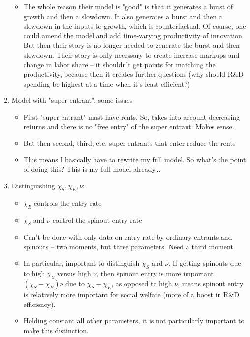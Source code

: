 \documentclass[12pt,english]{article}
\theoremstyle{remark}
\begin{document}
\begin{enumerate}
\begin{itemize}
		\item The whole reason their model is "good" is that it generates a burst of growth and then a slowdown. It also generates a burst and then a slowdown in the inputs to growth, which is counterfactual. Of course, one could amend the model and add time-varying productivity of innovation. But then their story is no longer needed to generate the burst and then slowdown. Their story is only necessary to create increase markups and change in labor share -- it shouldn't get points for matching the productivity, because then it creates further questions (why should R\&D spending be highest at a time when it's least efficient?)
	\end{itemize}
	\item Model with "super entrant": some issues
	\begin{itemize}
		\item First "super entrant" must have rents. So, takes into account decreasing returns and there is no "free entry" of the super entrant. Makes sense.
		\item But then second, third, etc. super entrants that enter reduce the rents
		\item This means I basically have to rewrite my full model. So what's the point of doing this? This is my full model already...
	\end{itemize}
	\item Distinguishing $\chi_S, \chi_E, \nu$:
	\begin{itemize}
		\item $\chi_E$ controls the entry rate
		\item $\chi_S$ and $\nu$ control the spinout entry rate
		\item Can't be done with only data on entry rate by ordinary entrants and spinouts -- two moments, but three parameters. Need a third moment.
		\item In particular, important to distinguish $\chi_S$ and $\nu$. If getting spinouts due to high $\chi_S$ versus high $\nu$, then spinout entry is more important $(\chi_S - \chi_E) \nu$ due to $\chi_S - \chi_E$, as opposed to high $\nu$, means spinout entry is relatively more important for social welfare (more of a boost in R\&D efficiency).
		\item Holding constant all other parameters, it is not particularly important to make this distinction.
		\begin{itemize}

\end{itemize}
\end{itemize}
\end{enumerate}
\end{document}
